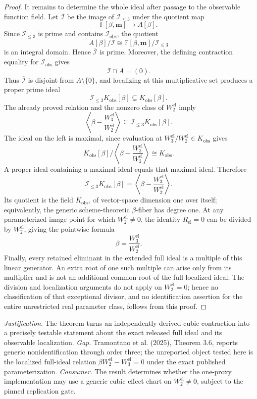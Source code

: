 \documentclass{article}
\begin{document}
\begin{proof}
It remains to determine the whole ideal after passage to the observable function field.  Let \(\overline{\mathcal I}\) be the image of \(\mathcal I_{\leq3}\) under the quotient map
\[
\mathbb F[\beta,\mathbf m]\longrightarrow A[\beta].
\]
Since \(\mathcal I_{\leq3}\) is prime and contains \(\mathcal I_{\mathrm{obs}}\), the quotient
\[
A[\beta]/\overline{\mathcal I}
\cong
\mathbb F[\beta,\mathbf m]/\mathcal I_{\leq3}
\]
is an integral domain.  Hence \(\overline{\mathcal I}\) is prime.  Moreover, the defining contraction equality for \(\mathcal I_{\mathrm{obs}}\) gives
\[
\overline{\mathcal I}\cap A=(0).
\]
Thus \(\overline{\mathcal I}\) is disjoint from \(A\setminus\{0\}\), and localizing at this multiplicative set produces a proper prime ideal
\[
\mathcal I_{\leq3}K_{\mathrm{obs}}[\beta]
\subsetneq K_{\mathrm{obs}}[\beta].
\]
The already proved relation and the nonzero class of \(W_2^{\mathrm{el}}\) imply
\[
\left\langle
\beta-\frac{W_3^{\mathrm{el}}}{W_2^{\mathrm{el}}}
\right\rangle
\subseteq
\mathcal I_{\leq3}K_{\mathrm{obs}}[\beta].
\]
The ideal on the left is maximal, since evaluation at \(W_3^{\mathrm{el}}/W_2^{\mathrm{el}}\in K_{\mathrm{obs}}\) gives
\[
K_{\mathrm{obs}}[\beta]
\bigg/
\left\langle
\beta-\frac{W_3^{\mathrm{el}}}{W_2^{\mathrm{el}}}
\right\rangle
\cong K_{\mathrm{obs}}.
\]
A proper ideal containing a maximal ideal equals that maximal ideal.  Therefore
\[
\mathcal I_{\leq3}K_{\mathrm{obs}}[\beta]
=
\left\langle
\beta-\frac{W_3^{\mathrm{el}}}{W_2^{\mathrm{el}}}
\right\rangle.
\]
Its quotient is the field \(K_{\mathrm{obs}}\), of vector-space dimension one over itself; equivalently, the generic scheme-theoretic \(\beta\)-fiber has degree one.  At any parameterized image point for which \(W_2^{\mathrm{el}}\ne0\), the identity \(R_{\mathrm{el}}=0\) can be divided by \(W_2^{\mathrm{el}}\), giving the pointwise formula
\[
\beta=\frac{W_3^{\mathrm{el}}}{W_2^{\mathrm{el}}}.
\]
Finally, every retained eliminant in the extended full ideal is a multiple of this linear generator.  An extra root of one such multiple can arise only from its multiplier and is not an additional common root of the full localized ideal.  The division and localization arguments do not apply on \(W_2^{\mathrm{el}}=0\); hence no classification of that exceptional divisor, and no identification assertion for the entire unrestricted real parameter class, follows from this proof.
\end{proof}
\par\smallskip\noindent \textit{Justification.} The theorem turns an independently derived cubic contraction into a precisely testable statement about the exact released full ideal and its observable localization. \textit{Gap.} Tramontano et al. (2025), Theorem 3.6, reports generic nonidentification through order three; the unreported object tested here is the localized full-ideal relation \(\beta W_2^{\mathrm{el}}-W_3^{\mathrm{el}}=0\) under the exact published parameterization. \textit{Consumer.} The result determines whether the one-proxy implementation may use a generic cubic effect chart on \(W_2^{\mathrm{el}}\ne0\), subject to the pinned replication gate.
\end{document}
